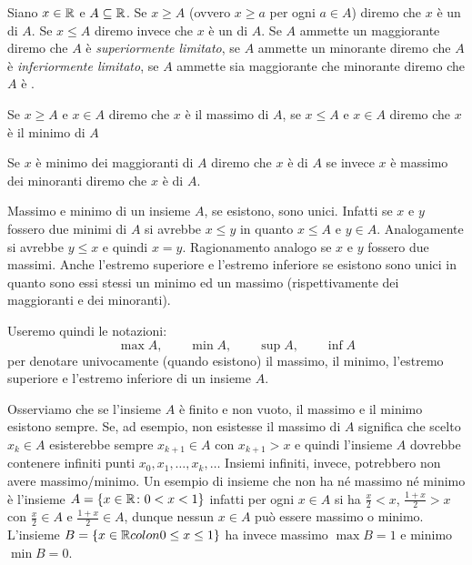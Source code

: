 \begin{definition}
\mymark{***}
Siano $x \in \mathbb R$ e $A \subseteq \mathbb R$.
Se $x \ge A$ (ovvero $x \ge a$ per ogni $a\in A$)
diremo che $x$ è un  di $A$.
Se $x \le A$ diremo invece che $x$ è un  di $A$.
Se $A$ ammette un maggiorante diremo che $A$ è \emph{superiormente limitato},
se $A$ ammette un minorante diremo che $A$ è \emph{inferiormente limitato},
se $A$ ammette sia maggiorante che minorante diremo che $A$ è .

Se $x\ge A$ e $x\in A$ diremo che $x$ è il massimo di $A$,
se $x\le A$ e $x\in A$ diremo che $x$ è il minimo di $A$

Se $x$ è minimo dei maggioranti di $A$ diremo che $x$ è
di $A$ se invece $x$ è massimo dei minoranti diremo che $x$ è
 di $A$.
\end{definition}

Massimo e minimo di un insieme $A$, se esistono, sono unici.
Infatti se $x$ e $y$ fossero due minimi di $A$ si avrebbe $x\le y$ in
quanto $x\le A$ e $y\in A$. Analogamente si avrebbe $y\le x$ e
quindi $x=y$. Ragionamento analogo se $x$ e $y$ fossero due massimi.
Anche l'estremo superiore e l'estremo inferiore se esistono sono
unici in quanto sono essi stessi un minimo ed un massimo
(rispettivamente dei maggioranti e dei minoranti).

Useremo quindi le notazioni:
\mymargin{$\max$ $\min$ $\sup$ $\inf$}
\[
 \max A, \qquad
 \min A, \qquad
 \sup A, \qquad
 \inf A
\]
per denotare univocamente (quando esistono) il massimo, il minimo,
l'estremo superiore e l'estremo inferiore di un insieme $A$.

Osserviamo che se l'insieme $A$ è finito e non vuoto,
il massimo e il minimo esistono
sempre.
Se, ad esempio, non esistesse il massimo di $A$ significa che scelto
$x_k\in A$ esisterebbe sempre $x_{k+1}\in A$ con $x_{k+1} > x$ e quindi l'insieme
$A$ dovrebbe contenere infiniti punti $x_0,x_1, \dots, x_k,\dots $
Insiemi infiniti, invece, potrebbero non avere massimo/minimo.
Un esempio di insieme che non ha né massimo né minimo è
l'insieme $A = \{x\in \mathbb R\colon 0<x<1\}$ infatti per ogni
$x\in A$ si ha $\frac x 2<x$, $\frac{1+x}{2}>x$
con $\frac x 2\in A$ e $\frac{1+x}{2}\in A$,
dunque nessun $x\in A$ può essere
massimo o minimo. L'insieme $B=\{x\in \mathbb R colon 0\le x \le 1\}$
ha invece massimo $\max B= 1$ e minimo $\min B=0$.

